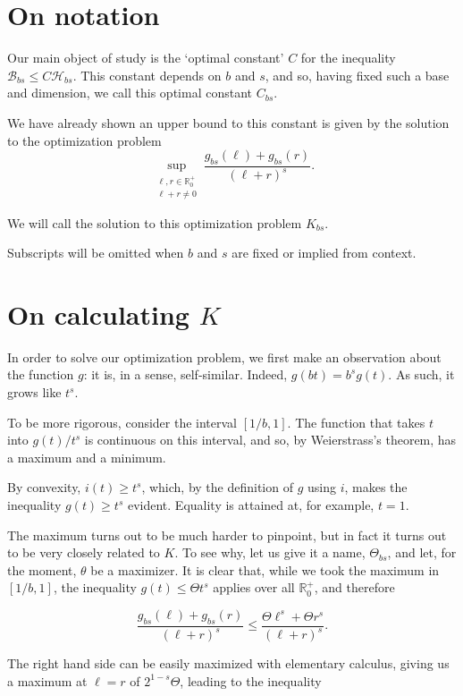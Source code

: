 \documentclass[11pt, reqno]{amsart}
\newcommand{\R}{\mathbb{R}}
\newcommand{\HH}{\mathcal{H}}
\newcommand{\BB}{\mathcal{B}}
\begin{document}
\section{On notation}

Our main object of study is the `optimal constant' $C$ for the inequality $\BB_{bs} \leq C \HH_{bs}$. This constant depends on $b$ and $s$, and so, having fixed such a base and dimension, we call this optimal constant $C_{bs}$.

We have already shown an upper bound to this constant is given by the solution to the optimization problem
\[ \sup_{\substack{\ell,r \in \R^+_0\\\ell+r \neq 0}} \frac{g_{bs}(\ell) + g_{bs}(r)}{(\ell + r)^s}.\]

We will call the solution to this optimization problem $K_{bs}$.

Subscripts will be omitted when $b$ and $s$ are fixed or implied from context.

\section{On calculating $K$} \label{calck}

In order to solve our optimization problem, we first make an observation about the function $g$: it is, in a sense, self-similar. Indeed, $g(b t) = b^s g(t)$. As such, it grows like $t^s$.

To be more rigorous, consider the interval $\left[ 1/b, 1 \right]$. The function that takes $t$ into $g(t)/t^s$ is continuous on this interval, and so, by Weierstrass's theorem, has a maximum and a minimum.

By convexity, $i(t) \geq t^s$, which, by the definition of $g$ using $i$, makes the inequality $g(t) \geq t^s$ evident. Equality is attained at, for example, $t = 1$.

The maximum turns out to be much harder to pinpoint, but in fact it turns out to be very closely related to $K$. To see why, let us give it a name, $\Theta_{bs}$, and let, for the moment, $\theta$ be a maximizer. It is clear that, while we took the maximum in $\left[ 1/b, 1 \right]$, the inequality $g(t) \leq \Theta t^s$ applies over all $\R^+_0$, and therefore

\[\frac{g_{bs}(\ell) + g_{bs}(r)}{(\ell + r)^s} \leq \frac{\Theta \ell^s + \Theta r^s}{(\ell+r)^s}.\]

The right hand side can be easily maximized with elementary calculus, giving us a maximum at $\ell = r$ of $2^{1-s} \Theta$, leading to the inequality
\end{document}
